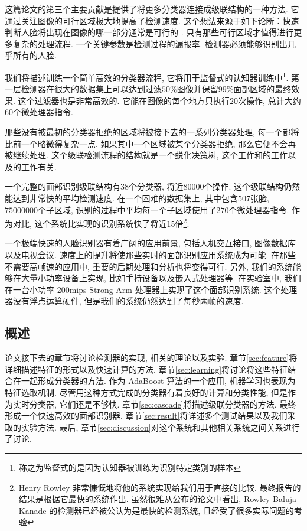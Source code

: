 \documentclass[a4paper,utf8,11pt]{ctexart}
\begin{document}
这篇论文的第三个主要贡献是提供了将更多分类器连接成级联结构的一种方法. 它通过关注图像的可行区域极大地提高了检测速度. 这个想法来源于如下论断：快速判断人脸将出现在图像的哪一部分通常是可行的
\citep{tsotsos1995modeling,itti1998model,amit1999computational,fleuret2001coarse}. 
只有那些可行区域才值得进行更多复杂的处理流程. 一个关键参数是检测过程的漏报率. 检测器必须能够识别出几乎所有的人脸. 

我们将描述训练一个简单高效的分类器流程, 它将用于监督式的认知器训练中\footnote{称之为监督式的是因为认知器被训练为识别特定类别的样本}. 第一层检测器在很大的数据集上可以达到过滤$50\%$图像并保留$99\%$面部区域的最终效果. 
这个过滤器也是非常高效的. 它能在图像的每个地方只执行$20$次操作, 总计大约$60$个微处理器指令. 

那些没有被最初的分类器拒绝的区域将被接下去的一系列分类器处理, 每一个都将比前一个略微得复杂一点. 如果其中一个区域被某个分类器拒绝, 那么它便不会再被继续处理. 这个级联检测流程的结构就是一个蜕化决策树, 这个工作和\citet{fleuret2001coarse}的工作以及\citet{amit1999computational}的工作有关. 

一个完整的面部识别级联结构有$38$个分类器, 将近$80000$个操作. 这个级联结构仍然能达到非常快的平均检测速度. 在一个困难的数据集上, 其中包含$507$张脸, $75000000$个子区域, 识别的过程中平均每一个子区域使用了$270$个微处理器指令. 作为对比, 这个系统比\citet{rowley1998neural}实现的识别系统快了将近$15$倍\footnote{Henry Rowley 非常慷慨地将他的系统实现给我们用于直接的比较. 最终报告的结果是根据它最快的系统作出. 虽然很难从公布的论文中看出, Rowley-Baluja-Kanade 的检测器已经被公认为是最快的检测系统, 且经受了很多实际问题的考验}. 

一个极端快速的人脸识别器有着广阔的应用前景, 包括人机交互接口, 图像数据库以及电视会议. 速度上的提升将使那些实时的面部识别应用系统成为可能. 在那些不需要高帧速的应用中, 重要的后期处理和分析也将变得可行. 
另外, 我们的系统能够在大量小功率设备上实现, 比如手持设备以及嵌入式处理器等. 在实验室中, 我们在一台小功率 200mips Strong Arm 处理器上实现了这个面部识别系统. 这个处理器没有浮点运算硬件, 但是我们的系统仍然达到了每秒两帧的速度. 
\subsection{概述}
论文接下去的章节将讨论检测器的实现, 相关的理论以及实验. 
章节\ref{sec:feature}将详细描述特征的形式以及快速计算的方法. 章节\ref{sec:learning}将讨论将这些特征结合在一起形成分类器的方法. 作为 AdaBoost 算法的一个应用, 机器学习也表现为特征选取机制. 尽管用这种方式完成的分类器有着良好的计算和分类性能, 但是作为实时分类器, 它们还是不够快. 
章节\ref{sec:cascade}将描述级联分类器的方法. 最终形成一个快速高效的面部识别器. 章节\ref{sec:result}将详述多个测试结果以及我们采取的实验方法. 最后, 章节\ref{sec:discussion}对这个系统和其他相关系统之间关系进行了讨论. 
\end{document}
